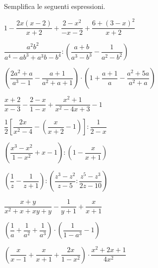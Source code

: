 \begin{esercizio}[*]
\label{ese:19.38}
Semplifica le seguenti espressioni.
\begin{enumeratea}
\item \(1-\dfrac{2x(x-2)}{x+2}+\dfrac{2-x^{2}}{-x-2}+
\dfrac{6+(3-x)^{2}}{x+2}\)
\item \(\dfrac{a^{2}b^{2}}{a^{4}-ab^{3}+a^{3}b-b^{4}}:
\left(\dfrac{a+b}{a^{3}-b^{3}}-\dfrac{1}{a^{2}-b^{2}}\right)\)
\item \(\left(\dfrac{2a^{2}+a}{a^{3}-1}-\dfrac{a+1}{a^{2}+a+1}\right)\cdot 
\left(1+\dfrac{a+1}{a}-\dfrac{a^{2}+5a}{a^{2}+a}\right)\)
\item \(\dfrac{x+2}{x-3}-\dfrac{2-x}{1-x}+\dfrac{x^{2}+1}{x^{2}-4x+3}-1\)
\item \(\dfrac{1}{2}\left[\dfrac{2x}{x^{2}-4}-
\left(\dfrac{x}{x+2}-1\right)\right]:\dfrac{1}{2-x}\)
\item \(\left(\dfrac{x^{3}-x^{2}}{1-x^{2}}+x-1\right):
\left(1-\dfrac{x}{x+1}\right)\)
\item \(\left(\dfrac{1}{z}-\dfrac{1}{z+1}\right):
\left(\dfrac{z^{3}-z^{2}}{z-5}:\dfrac{z^{5}-z^{3}}{2z-10}\right)\)
\item \(\dfrac{x+y}{x^{2}+x+xy+y}-\dfrac{1}{y+1}+\dfrac{x}{x+1}\)
\item \(\left(\dfrac{1}{a}+\dfrac{1}{a^{2}}+\dfrac{1}{a^{3}}\right)\cdot 
\left(\dfrac{1}{1-a^{3}}-1\right)\)
\item \(\left(\dfrac{x}{x-1}+\dfrac{x}{x+1}+\dfrac{2x}{1-x^{2}}\right)\cdot 
{\dfrac{x^{2}+2x+1}{4x^{2}}}\)
\end{enumeratea}
\end{esercizio}


